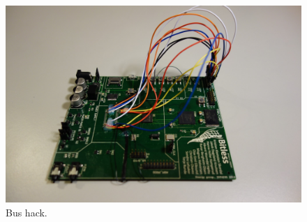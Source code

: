 \begin{figure}[H]
    \centering
    \includegraphics[scale=0.15]{figures/results/pcb/bus}
    \caption{Bus hack.}
    \label{fig:res:bus}
\end{figure}
